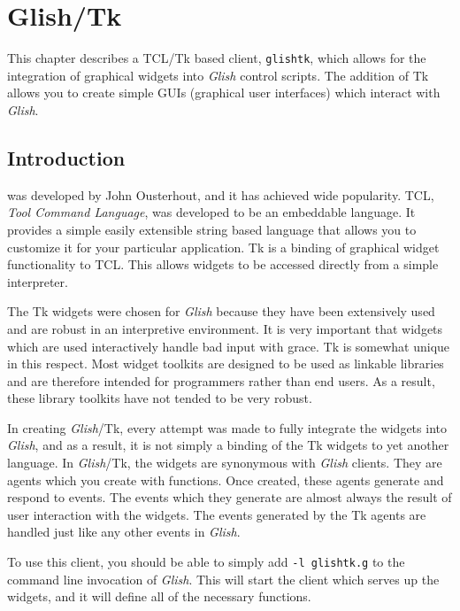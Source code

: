 
\chapter{Glish/Tk}
\label{glishtk}

This chapter describes a TCL/Tk based client, {\tt glishtk}, which allows for the
integration of graphical widgets into {\em Glish} control
scripts. 
The addition of Tk allows you to  
create simple GUIs (graphical user interfaces) 
which interact with
{\em Glish}.

\section{Introduction}
 was developed
by John Ousterhout, and it has achieved wide popularity. TCL, {\em Tool Command
Language}, was developed to be an embeddable language. It provides a simple
easily extensible string based language that allows you to customize
it for your particular application. Tk is a binding of graphical widget
functionality to TCL. This allows widgets to be accessed directly from a
simple interpreter.

The Tk widgets were chosen for {\em Glish} because they have been 
extensively used
and are robust in an interpretive environment. It is very important that
widgets which are used interactively handle bad input with grace. Tk is
somewhat unique in this respect. Most widget toolkits are designed
to be used as linkable libraries and are therefore intended for programmers
rather than end users. As a result, these library toolkits have not tended
to be very robust.

In creating {\em Glish}/Tk, every attempt was made to fully integrate the widgets
into {\em Glish}, and as a result, it is not simply a binding of the Tk widgets
to yet another language. In {\em Glish}/Tk, the widgets are 
synonymous with {\em Glish}
clients. They are agents which you create with functions. Once
created, these agents generate and respond to events. The events which
they generate are almost always the result of user interaction with the
widgets. The events generated by the Tk agents are handled just like any
other events in {\em Glish}.

To use this client, you should be able to simply add {\tt -l glishtk.g} to
the command line invocation of {\em Glish}. This will start the client which
serves up the widgets, and it will define all of the necessary functions.

